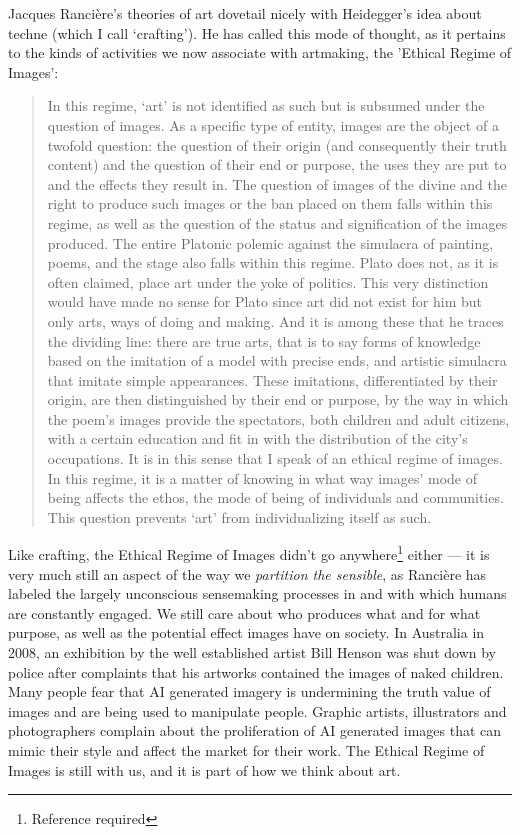\documentclass[letterpaper]{article}
\begin{document}
Jacques Rancière's theories of art dovetail nicely with Heidegger's idea about techne (which I call ‘crafting’). He has called this mode of thought, as it pertains to the kinds of activities we now associate with artmaking, the ’Ethical Regime of Images’:

\begin{quote}
    In this regime, ‘art’ is not identified as such but is subsumed under the question of images. As a specific type of entity, images are the object of a twofold question: the question of their origin (and consequently their truth content) and the question of their end or purpose, the uses they are put to and the effects they result in. The question of images of the divine and the right to produce such images or the ban placed on them falls within this regime, as well as the question of the status and signification of the images produced. The entire Platonic polemic against the simulacra of painting, poems, and the stage also falls within this regime. Plato does not, as it is often claimed, place art under the yoke of politics. This very distinction would have made no sense for Plato since art did not exist for him but only arts, ways of doing and making. And it is among these that he traces the dividing line: there are true arts, that is to say forms of knowledge based on the imitation of a model with precise ends, and artistic simulacra that imitate simple appearances. These imitations, differentiated by their origin, are then distinguished by their end or purpose, by the way in which the poem's images provide the spectators, both children and adult citizens, with a certain education and fit in with the distribution of the city's occupations. It is in this sense that I speak of an ethical regime of images. In this regime, it is a matter of knowing in what way images' mode of being affects the ethos, the mode of being of individuals and communities. This question prevents ‘art’ from individualizing itself as such. \citep[pp.20-21]{RancierPltcsOfThAsthtcs2004}
\end{quote}

Like crafting, the Ethical Regime of Images didn't go anywhere\footnote{Reference required} either — it is very much still an aspect of the way we \emph{partition the sensible}, as Rancière has labeled the largely unconscious sensemaking processes in and with which humans are constantly engaged. We still care about who produces what and for what purpose, as well as the potential effect images have on society. In Australia in 2008, an exhibition by the well established artist Bill Henson was shut down by police after complaints that his artworks contained the images of naked children. Many people fear that AI generated imagery is undermining the truth value of images and are being used to manipulate people. Graphic artists, illustrators and photographers complain about the proliferation of AI generated images that can mimic their style and affect the market for their work. The Ethical Regime of Images is still with us, and it is part of how we think about art. 
\end{document}
